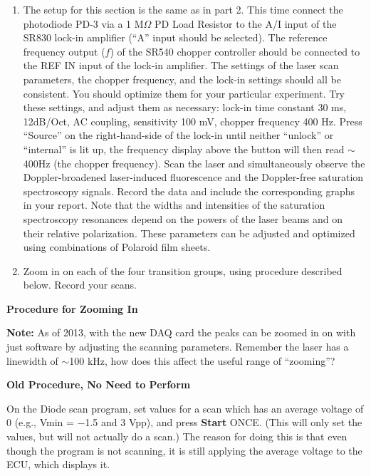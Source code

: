 \documentclass{../lab}
\begin{document}
\begin{enumerate}
    \item The setup for this section is the same as in part 2. This time connect the photodiode PD-3 via a 1 M$\Omega$ PD Load Resistor to the A/I input of the SR830 lock-in amplifier (``A'' input should be selected). The reference frequency output ($f$) of the SR540 chopper controller should be connected to the REF IN input of the lock-in amplifier. The settings of the laser scan parameters, the chopper frequency, and the lock-in settings should all be consistent. You should optimize them for your particular experiment. Try these settings, and adjust them as necessary: lock-in time constant 30 ms, 12dB/Oct, AC coupling, sensitivity 100 mV, chopper frequency 400 Hz. Press ``Source'' on the right-hand-side of the lock-in until neither ``unlock'' or ``internal'' is lit up, the frequency display above the button will then read $\sim$400Hz (the chopper frequency). Scan the laser and simultaneously observe the Doppler-broadened laser-induced fluorescence and the Doppler-free saturation spectroscopy signals. Record the data and include the corresponding graphs in your report. Note that the widths and intensities of the saturation spectroscopy resonances depend on the powers of the laser beams and on their relative polarization. These parameters can be adjusted and optimized using combinations of Polaroid film sheets.

    \item Zoom in on each of the four transition groups, using procedure described below. Record your scans.

\end{enumerate}

\textbf{Procedure for Zooming In}

\textbf{Note:} As of 2013, with the new DAQ card the peaks can be zoomed in on with just software by adjusting the scanning parameters. Remember the laser has a linewidth of $\sim$100 kHz, how does this affect the useful range of ``zooming''?

\textbf{Old Procedure, No Need to Perform}

On the Diode scan program, set values for a scan which has an average voltage of 0 (e.g., Vmin = $-$1.5 and 3 Vpp), and press \textbf{Start} ONCE. (This will only set the values, but will not actually do a scan.) The reason for doing this is that even though the program is not scanning, it is still applying the average voltage to the ECU, which displays it.
\end{document}
